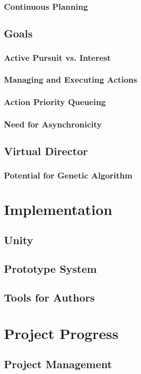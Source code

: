 \documentclass{sig-alternate-05-2015}
\begin{document}
\subsubsection{Continuous Planning}
\subsection{Goals}
\subsubsection{Active Pursuit vs. Interest}
\subsubsection{Managing and Executing Actions}
\subsubsection{Action Priority Queueing}
\subsubsection{Need for Asynchronicity}
\subsection{Virtual Director}
\subsubsection{Potential for Genetic Algorithm}

\section{Implementation}
\subsection{Unity}
\subsection{Prototype System}
\subsection{Tools for Authors}

\section{Project Progress}
\subsection{Project Management}
\end{document}
